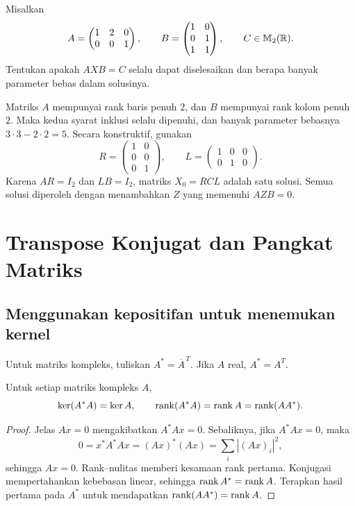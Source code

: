 \begin{exam}
    Misalkan
    \[
        A=\begin{pmatrix}1&2&0\\0&0&1\end{pmatrix},\qquad
        B=\begin{pmatrix}1&0\\0&1\\1&1\end{pmatrix},\qquad
        C\in\mathbb{M}_2(\mathbb{R}).
    \]
    Tentukan apakah $AXB=C$ selalu dapat diselesaikan dan berapa banyak
    parameter bebas dalam solusinya.
\end{exam}
\begin{solution}
    Matriks $A$ mempunyai rank baris penuh $2$, dan $B$ mempunyai
    rank kolom penuh $2$. Maka kedua syarat inklusi selalu dipenuhi,
    dan banyak parameter bebasnya $3\cdot3-2\cdot2=5$.
    Secara konstruktif, gunakan
    \[
        R=\begin{pmatrix}1&0\\0&0\\0&1\end{pmatrix},\qquad
        L=\begin{pmatrix}1&0&0\\0&1&0\end{pmatrix}.
    \]
    Karena $AR=I_2$ dan $LB=I_2$, matriks $X_0=RCL$ adalah satu solusi.
    Semua solusi diperoleh dengan menambahkan $Z$ yang memenuhi $AZB=0$.
\end{solution}

\section{Transpose Konjugat dan Pangkat Matriks}
\label{rank:pangkat}

\subsection{Menggunakan kepositifan untuk menemukan kernel}

Untuk matriks kompleks, tuliskan $A^*=\overline A^{\,T}$.
Jika $A$ real, $A^*=A^T$.

\begin{teorema}
    Untuk setiap matriks kompleks $A$,
    \[
        \ker(A^*A)=\ker A,\qquad
        \operatorname{rank}(A^*A)=\operatorname{rank} A=\operatorname{rank}(AA^*).
    \]
\end{teorema}
\begin{proof}
    Jelas $Ax=0$ mengakibatkan $A^*Ax=0$.
    Sebaliknya, jika $A^*Ax=0$, maka
    \[
        0=x^*A^*Ax=(Ax)^*(Ax)=\sum_i |(Ax)_i|^2,
    \]
    sehingga $Ax=0$.
    Rank--nulitas memberi kesamaan rank pertama.
    Konjugasi mempertahankan kebebasan linear, sehingga
    $\operatorname{rank} A^*=\operatorname{rank} A$. Terapkan hasil pertama pada $A^*$ untuk
    mendapatkan $\operatorname{rank}(AA^*)=\operatorname{rank} A$.
\end{proof}

